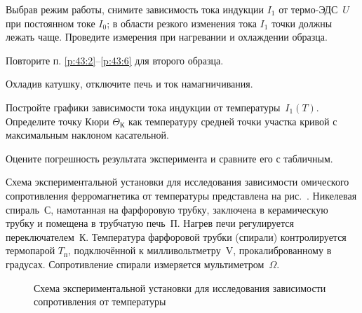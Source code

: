 \begin{lab:task}
\item \label{p:43:6}
  Выбрав режим работы, снимите зависимость тока индукции $I_1$ от термо-ЭДС~$U$
при постоянном токе $I_0$; в области резкого изменения тока $I_1$ точки 
должны лежать чаще. Проведите измерения при нагревании и охлаждении образца.

\item Повторите п. \ref{p:43:2}--\ref{p:43:6} для второго образца.
\item Охладив катушку, отключите печь и ток намагничивания.


\item Постройте графики зависимости тока индукции от температуры~$I_1(T)$. 
Определите точку Кюри $\Theta_{К}$ как температуру средней точки участка
кривой с максимальным наклоном касательной.



\item Оцените погрешность результата эксперимента и сравните его с табличным.

\end{lab:task}


\experiment

Схема экспериментальной установки для исследования зависимости омического
сопротивления ферромагнетика от температуры представлена на
рис.~. 
Никелевая спираль~С, намотанная на фарфоровую трубку, 
заключена в керамическую трубку и помещена в трубчатую печь~П. 
Нагрев печи регулируется переключателем~К. Температура фарфоровой трубки 
(спирали) контролируется термопарой $T_{\text{п}}$, подключённой к 
милливольтметру~V, прокалиброванному в градусах. Сопротивление
спирали измеряется мультиметром~$\Omega$.

\begin{figure}[h!]
    \centering
    \caption{Схема экспериментальной установки для исследования
        зависимости сопротивления от температуры}
\end{figure}


